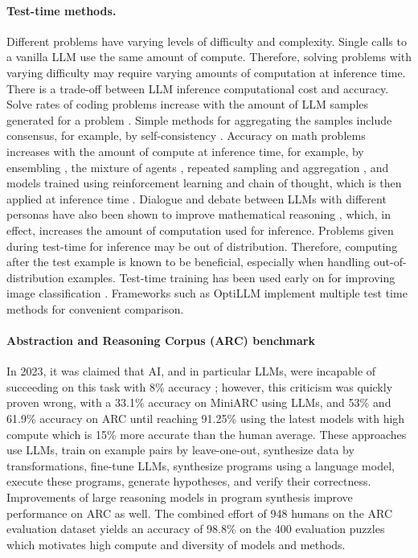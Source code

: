 \paragraph{Test-time methods.}
Different problems have varying levels of difficulty and complexity. Single calls to a vanilla LLM use the same amount of compute. Therefore, solving problems with varying difficulty may require varying amounts of computation at inference time. There is a trade-off between LLM inference computational cost and accuracy. Solve rates of coding problems increase with the amount of LLM samples generated for a problem \cite{alphacode2techreport}. Simple methods for aggregating the samples include consensus, for example, by self-consistency \cite{wang2022self}. Accuracy on math problems increases with the amount of compute at inference time, for example, by ensembling \cite{jiang2023llm}, the mixture of agents \cite{wang2024mixture}, repeated sampling and aggregation \cite{brown2024large,chen2024more}, and models trained using reinforcement learning and chain of thought, which is then applied at inference time \cite{strawberry}. Dialogue and debate between LLMs with different personas have also been shown to improve mathematical reasoning \cite{du2023improvingfactualityreasoninglanguage}, which, in effect, increases the amount of computation used for inference. Problems given during test-time for inference may be out of distribution. Therefore, computing after the test example is known to be beneficial, especially when handling out-of-distribution examples. Test-time training has been used early on for improving image classification \cite{sun2020test}. Frameworks such as OptiLLM \cite{optillm} implement multiple test time methods for convenient comparison. 



\paragraph{Abstraction and Reasoning Corpus (ARC) benchmark}
In 2023, it was claimed that AI, and in particular LLMs, were incapable of succeeding on this task with 8\% accuracy \cite{biever2023chatgpt}; however, this criticism was quickly proven wrong, with a 33.1\% accuracy on MiniARC \cite{qiu2023phenomenal} using LLMs, and 53\% \cite{li2024combining} and 61.9\% \cite{akyurek2024surprising} accuracy on ARC until reaching 91.25\% using the latest models with high compute which is 15\% more accurate than the human average. These approaches use LLMs, train on example pairs by leave-one-out, synthesize data by transformations, fine-tune LLMs, synthesize programs using a language model, execute these programs, generate hypotheses, and verify their correctness. Improvements of large reasoning models in program synthesis \cite{el2025competitive} improve performance on ARC as well. The combined effort of 948 humans on the ARC evaluation dataset yields an accuracy of 98.8\% \cite{legris2024h} on the 400 evaluation puzzles which motivates high compute and diversity of models and methods.

